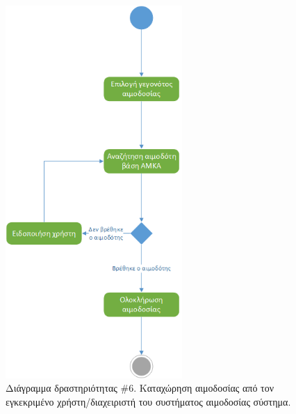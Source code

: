 				
		\begin{figure}[H]
		    \centering
		    \includegraphics[width=0.6\textwidth]{CompleteDonation.png}
		    \caption{Διάγραμμα δραστηριότητας \#6. Καταχώρηση αιμοδοσίας από τον  εγκεκριμένο χρήστη/διαχειριστή του συστήματος αιμοδοσίας σύστημα.}
		    \label{fig:complete}
		\end{figure}
		

